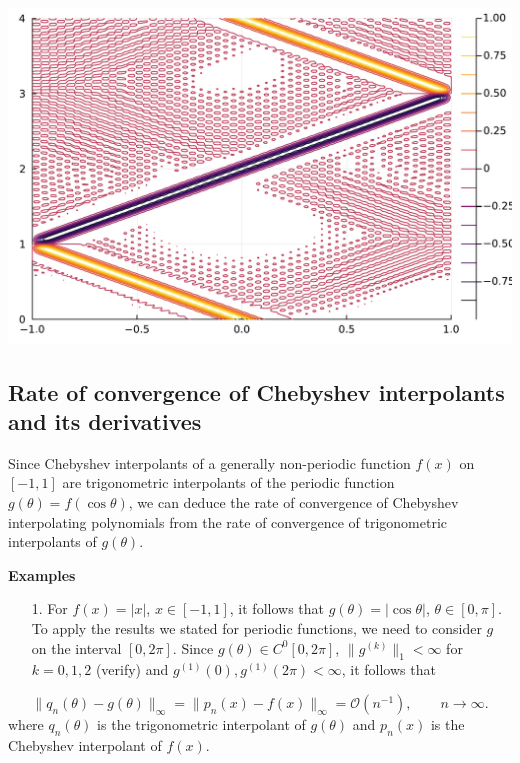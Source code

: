 \documentclass[12pt,a4paper]{article}
\begin{document}
\includegraphics[width=\linewidth]{jl_CPj2Me/Chebyshev_test_14_1.pdf}

\subsection{Rate of convergence of Chebyshev interpolants and its derivatives}
Since Chebyshev interpolants of a generally non-periodic function $f(x)$ on $[-1, 1]$ are trigonometric interpolants of the periodic function $g(\theta) = f(\cos\theta)$, we can deduce the rate of convergence of Chebyshev interpolating polynomials from the rate of convergence of trigonometric interpolants of $g(\theta)$.

\textbf{Examples}

\begin{itemize}
\item[1. ] For $f(x) = \vert x \vert$, $x \in [-1, 1]$, it follows that $g(\theta) = \vert \cos\theta \vert$, $\theta \in [0, \pi]$.  To apply the results we stated for periodic functions, we need to consider $g$ on the interval $[0, 2\pi]$.  Since $g(\theta) \in C^{0}[0, 2\pi]$, $\| g^{(k)}\|_1 < \infty$ for $k = 0, 1, 2$ (verify) and $g^{(1)}(0), g^{(1)}(2\pi) < \infty$, it follows that

\end{itemize}
\[
\| q_n(\theta) - g(\theta) \|_{\infty} = \| p_n(x) - f(x) \|_{\infty} = \mathcal{O}\left( n^{-1} \right), \qquad n \to \infty.
\]
where $q_n(\theta)$ is the trigonometric interpolant of $g(\theta)$ and $p_n(x)$ is the Chebyshev interpolant of $f(x)$.
\end{document}
